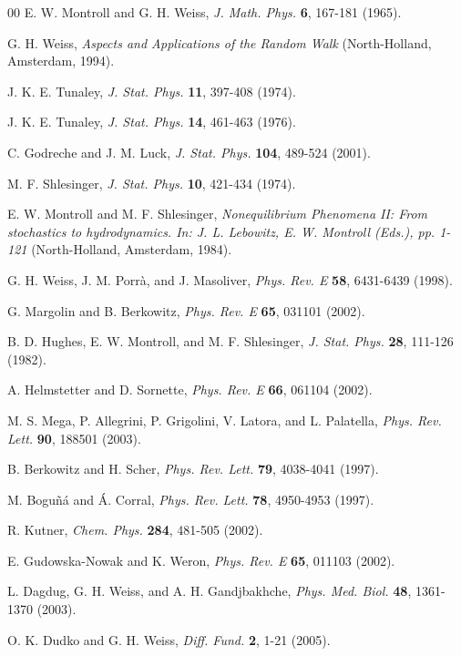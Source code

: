 \documentclass[english,aps,a4paper,twocolumn,showpacs,showkeys,amsfonts,amsmath,amssymb,amscd,nofootinbib]{revtex4}
\def\Journal#1#2#3#4#5#6{{#1}, {\it #4} \textbf{#5}, #6 (#2).}
\def\Book#1#2#3#4#5{{#1}, {\it #3} (#4, #5, #2).}
\newcommand{\1}{\'\i}
\begin{document}
\begin{thebibliography}{00}
 \Journal{E. W. Montroll and G. H. Weiss}{1965}{Random Walks on
Lattices, II}{J. Math. Phys.}{6}{167-181}%

 \Book{G. H. Weiss}{1994}{Aspects and Applications of the Random
Walk}{North-Holland}{Amsterdam}%

 \Journal{J. K. E. Tunaley}{1974}{}{J. Stat.
Phys.}{11}{397-408}%

 \Journal{J. K. E. Tunaley}{1976}{}{J. Stat.
Phys.}{14}{461-463}%

 \Journal{C. Godreche and J. M. Luck}{2001}{}{J. Stat.
Phys.}{104}{489-524}%

   \Journal{M. F. Shlesinger}{1974}{} {J. Stat.
Phys.}{10}{421-434}%

 \Book{E. W. Montroll and M. F. Shlesinger}{1984}{Nonequilibrium
Phenomena II: From stochastics to hydrodynamics. {\rm In: J. L. Lebowitz, E. W.
Montroll (Eds.), pp. 1-121}}{North-Holland}{Amsterdam}%

 \Journal{G. H. Weiss, J. M. Porr\`a, and J. Masoliver}{1998}{ }{Phys. Rev. E}{58}{6431-6439}%

 \Journal{G. Margolin and B. Berkowitz}{2002}{}{Phys. Rev. E}{65}{031101}%

 \Journal{B. D. Hughes,  E. W.  Montroll, and  M. F. Shlesinger}{1982}{Fractal random walks} {J. Stat. Phys.}{28}{111-126}%

 \Journal{A. Helmstetter and D. Sornette}{2002}{}{Phys. Rev. E}{66}{061104}%

 \Journal{M. S. Mega, P. Allegrini, P. Grigolini, V. Latora, and  L.
Palatella}{2003}{ }{Phys. Rev. Lett.}{90}{188501}%

 \Journal{B. Berkowitz and H. Scher}{1997}{}{Phys. Rev. Lett.}{79}{4038-4041}%

 \Journal{M. Bogu\~n\'a and  \'A. Corral}{1997}{}{Phys. Rev. Lett.}{78}{4950-4953}%

 \Journal{R. Kutner}{2002}{} {Chem. Phys.}{284}{481-505}%

 \Journal{E. Gudowska-Nowak and K. Weron}{2002}{}{Phys. Rev. E}{65}{011103}%

 \Journal{L. Dagdug, G. H.  Weiss, and A. H. Gandjbakhche}{2003}{}{Phys. Med. Biol.}{48}{1361-1370}%

 \Journal{O. K.  Dudko and  G. H.  Weiss}{2005}{ }{Diff. Fund.}{2}{1-21}%


\end{thebibliography}
\end{document}

